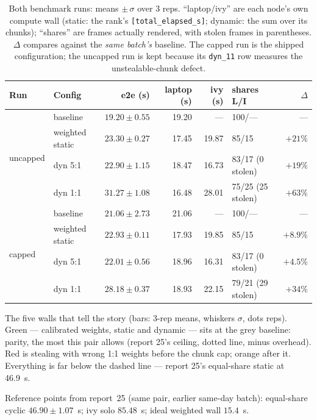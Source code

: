 \documentclass[
	english,
	letterpaper, oneside
]{article}
\begin{document}
\begin{table}[H]
\centering
\caption{Both benchmark runs: means $\pm\,\sigma$ over 3 reps.
``laptop/ivy'' are each node's own compute wall (static: the rank's
\texttt{[total\_elapsed\_s]}; dynamic: the sum over its chunks); ``shares''
are frames actually rendered, with stolen frames in parentheses.
$\Delta$ compares against the \emph{same batch's} baseline. The capped run
is the shipped configuration; the uncapped run is kept because its
\texttt{dyn\_11} row measures the unstealable-chunk defect.\label{tab:bench}}
\small
\begin{tabular}{llrrrlr}
\toprule
Run & Config & e2e (s) & laptop (s) & ivy (s) & shares L/I & $\Delta$ \\
\midrule
\multirow{4}{*}{uncapped}
 & baseline        & $19.20\pm0.55$ & 19.20 & --- & 100/--- & --- \\
 & weighted static & $23.30\pm0.27$ & 17.45 & 19.87 & 85/15 & $+21\%$ \\
 & dyn 5:1         & $22.90\pm1.15$ & 18.47 & 16.73 & 83/17 (0 stolen) & $+19\%$ \\
 & dyn 1:1         & $31.27\pm1.08$ & 16.48 & 28.01 & 75/25 (25 stolen) & $+63\%$ \\
\midrule
\multirow{4}{*}{capped}
 & baseline        & $21.06\pm2.73$ & 21.06 & --- & 100/--- & --- \\
 & weighted static & $22.93\pm0.11$ & 17.93 & 19.85 & 85/15 & $+8.9\%$ \\
 & dyn 5:1         & $\mathbf{22.01\pm0.56}$ & 18.96 & 16.31 & 83/17 (0 stolen) & $+4.5\%$ \\
 & dyn 1:1         & $\mathbf{28.18\pm0.37}$ & 18.93 & 22.15 & 79/21 (29 stolen) & $+34\%$ \\
\bottomrule
\end{tabular}
\end{table}

            {The five walls that tell the story (bars: 3-rep means, whiskers
             $\sigma$, dots reps). Green --- calibrated weights, static and
             dynamic --- sits at the grey baseline: parity, the most this
             pair allows (report 25's ceiling, dotted line, minus overhead).
             Red is stealing with wrong 1:1 weights before the chunk cap;
             orange after it. Everything is far below the dashed line ---
             report 25's equal-share static at 46.9~s.\label{fig:bench}}

Reference points from report~25 (same pair, earlier same-day batch):
equal-share cyclic $46.90\pm1.07$~s; ivy solo $85.48$~s; ideal weighted
wall $15.4$~s.
\end{document}
